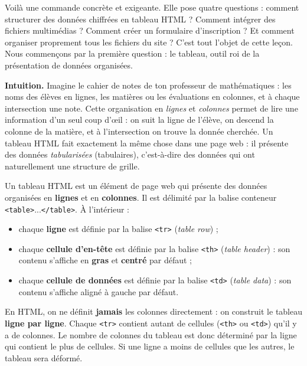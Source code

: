 \documentclass[11pt]{article}
\newcommand{\cle}[1]{{\popxbold\color{popdark}#1}}
\newcounter{popsec}
\newcounter{popsub}
\newcommand{\courssub}[1]{%
  \stepcounter{popsub}%
  \par\vspace{9pt}\noindent{\popxbold\fontsize{11.5}{13}\selectfont\color{popink}{\color{poporange}\thepopsec.\thepopsub}\hspace{6pt}#1}\par\nopagebreak\vspace{4pt}
}
\begin{document}
Voil\`a une commande concr\`ete et exigeante. Elle pose quatre questions : comment structurer des donn\'ees chiffr\'ees en \cle{tableau} HTML ? Comment int\'egrer des fichiers multim\'edias ? Comment cr\'eer un formulaire d'inscription ? Et comment organiser proprement tous les fichiers du site ? C'est tout l'objet de cette le\c{c}on. Nous commen\c{c}ons par la premi\`ere question : le tableau, outil roi de la pr\'esentation de donn\'ees organis\'ees.

\courssub{Qu'est-ce qu'un tableau HTML ?}

\textbf{Intuition.} Imagine le cahier de notes de ton professeur de math\'ematiques : les noms des \'el\`eves en lignes, les mati\`eres ou les \'evaluations en colonnes, et \`a chaque intersection une note. Cette organisation en \emph{lignes} et \emph{colonnes} permet de lire une information d'un seul coup d'\oe{}il : on suit la ligne de l'\'el\`eve, on descend la colonne de la mati\`ere, et \`a l'intersection on trouve la donn\'ee cherch\'ee. Un tableau HTML fait exactement la m\^eme chose dans une page web : il pr\'esente des donn\'ees \emph{tabularis\'ees} (tabulaires), c'est-\`a-dire des donn\'ees qui ont naturellement une structure de grille.

\begin{definition}
Un \cle{tableau HTML} est un \'el\'ement de page web qui pr\'esente des donn\'ees organis\'ees en \textbf{lignes} et en \textbf{colonnes}. Il est d\'elimit\'e par la balise conteneur \texttt{<table>}...\texttt{</table>}. \`A l'int\'erieur :
\begin{itemize}
  \item chaque \textbf{ligne} est d\'efinie par la balise \texttt{<tr>} (\emph{table row}) ;
  \item chaque \textbf{cellule d'en-t\^ete} est d\'efinie par la balise \texttt{<th>} (\emph{table header}) : son contenu s'affiche en \textbf{gras} et \textbf{centr\'e} par d\'efaut ;
  \item chaque \textbf{cellule de donn\'ees} est d\'efinie par la balise \texttt{<td>} (\emph{table data}) : son contenu s'affiche align\'e \`a gauche par d\'efaut.
\end{itemize}
\end{definition}

\begin{attention}
En HTML, on ne d\'efinit \textbf{jamais} les colonnes directement : on construit le tableau \textbf{ligne par ligne}. Chaque \texttt{<tr>} contient autant de cellules (\texttt{<th>} ou \texttt{<td>}) qu'il y a de colonnes. Le nombre de colonnes du tableau est donc d\'etermin\'e par la ligne qui contient le plus de cellules. Si une ligne a moins de cellules que les autres, le tableau sera d\'eform\'e.
\end{attention}
\end{document}
